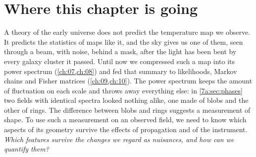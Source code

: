 \providecommand{\MkBcut}{}\renewcommand{\MkBcut}{20}
\providecommand{\MkFsky}{}\renewcommand{\MkFsky}{65.8}
\providecommand{\MkLam}{}\renewcommand{\MkLam}{306}
\providecommand{\MkLone}{}\renewcommand{\MkLone}{5.9}
\providecommand{\MkLtwo}{}\renewcommand{\MkLtwo}{8.27}
\providecommand{\MkZeroMC}{}\renewcommand{\MkZeroMC}{14.5}
\providecommand{\MkZeroSe}{}\renewcommand{\MkZeroSe}{0.9}
\providecommand{\MkZeroTh}{}\renewcommand{\MkZeroTh}{17.4}
\providecommand{\MkZeroNaive}{}\renewcommand{\MkZeroNaive}{0.66}
\providecommand{\MkEdgeZero}{}\renewcommand{\MkEdgeZero}{16.4}
\providecommand{\MkOneMC}{}\renewcommand{\MkOneMC}{109}
\providecommand{\MkOneTh}{}\renewcommand{\MkOneTh}{108}
\providecommand{\MkOneNaive}{}\renewcommand{\MkOneNaive}{97}
\providecommand{\MkOneSd}{}\renewcommand{\MkOneSd}{18}
\providecommand{\MkMaxPull}{}\renewcommand{\MkMaxPull}{3.7}
\section*{Where this chapter is going}
\label{12a:sec:roadmap}

A theory of the early universe does not predict the temperature map we observe. It predicts the
statistics of maps like it, and the sky gives us one of them, seen through a beam, with noise, behind a
mask, after the light has been bent by every galaxy cluster it passed. Until now we compressed such a
map into its power spectrum (\cref{ch:07,ch:08}) and fed that summary to likelihoods, Markov chains and
Fisher matrices (\cref{ch:09,ch:10}). The power spectrum keeps the amount of fluctuation on each scale and
throws away everything else: in \cref{7a:sec:phases} two fields with identical spectra looked nothing
alike, one made of blobs and the other of rings. The difference between blobs and rings suggests a measurement of shape.
To use such a measurement on an observed field, we need to know which aspects
of its geometry survive the effects of propagation and of the instrument.
\emph{Which features survive the changes we regard as nuisances, and how
can we quantify them?}

